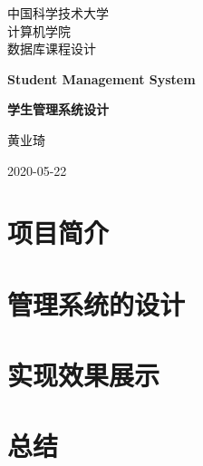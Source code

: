 \documentclass[10pt,english, openany]{book}
\begin{document}

\begin{titlepage}
	\clearpage\thispagestyle{empty}
	\centering
	\vspace{1cm}

	{\normalsize 中国科学技术大学\\
	计算机学院\\
	数据库课程设计 \par}
		\vspace{3cm}
	{\Huge \textbf{Student Management System}} \\
	\vspace{1cm}
	{\large \textbf{学生管理系统设计} \par}
	\vspace{4cm}
	{\normalsize 黄业琦\par}
	\vspace{5cm}
    
    \centering 
    
    \vspace{0.5cm}
		
	{\normalsize 2020-05-22 \par}
	
	\pagebreak

\end{titlepage}

\tableofcontents{}

\mainmatter

\chapter{项目简介}






\chapter{管理系统的设计}


\chapter{实现效果展示}


\chapter{总结}


\pagebreak
\printbibliography[title=参考文献]

\pagebreak
\end{document}
